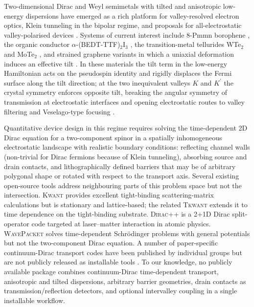 \documentclass[preprint, 11pt]{elsarticle}
\begin{document}
Two-dimensional Dirac and Weyl semimetals with tilted and anisotropic
low-energy dispersions have emerged as a rich platform for
valley-resolved electron optics, Klein tunneling in the bipolar
regime, and proposals for all-electrostatic valley-polarised devices
\cite{CastroNeto2009,Goerbig2008,Kong2021,Zhang2018,Nguyen2018}.
Systems of current interest include 8-Pmmn borophene
\cite{LopezBezanilla2016,Zabolotskiy2016}, the organic conductor
$\alpha$-(BEDT-TTF)$_2$I$_3$ \cite{Goerbig2008}, the transition-metal
tellurides WTe$_2$ and MoTe$_2$ \cite{Soluyanov2015,Wang2019}, and
strained graphene variants in which a uniaxial deformation induces an
effective tilt \cite{Pereira2009,Oliva2020}. In these materials the
tilt term in the low-energy Hamiltonian acts on the pseudospin
identity and rigidly displaces the Fermi surface along the tilt
direction; at the two inequivalent valleys $K$ and $K^\prime$ the
crystal symmetry enforces opposite tilt, breaking the angular
symmetry of transmission at electrostatic interfaces and opening
electrostatic routes to valley filtering and Veselago-type focusing
\cite{Nguyen2018,Cheianov2007}.

Quantitative device design in this regime requires solving the
time-dependent 2D Dirac equation for a two-component spinor in a
spatially inhomogeneous electrostatic landscape with realistic
boundary conditions: reflecting channel walls (non-trivial for Dirac
fermions because of Klein tunneling), absorbing source and drain
contacts, and lithographically defined barriers that may be of
arbitrary polygonal shape or rotated with respect to the transport
axis. Several existing open-source tools address neighbouring parts
of this problem space but not the intersection. \textsc{Kwant}
\cite{Groth2014} provides excellent tight-binding scattering-matrix
calculations but is stationary and lattice-based; the related
\textsc{Tkwant} \cite{Kloss2021} extends it to time dependence on the
tight-binding substrate. \textsc{Dirac++} \cite{Mocken2008} is a
2+1D Dirac split-operator code targeted at laser--matter interaction
in atomic physics. \textsc{WavePacket} \cite{Schmidt2019} solves
time-dependent Schr\"odinger problems with general potentials but
not the two-component Dirac equation. A number of paper-specific
continuum-Dirac transport codes have been published by individual
groups but are not publicly released as installable tools
\cite{Chaves2015}. To our knowledge, no publicly available package
combines continuum-Dirac time-dependent transport, anisotropic and
tilted dispersions, arbitrary barrier geometries, drain contacts as
transmission/reflection detectors, and optional intervalley coupling
in a single installable workflow.
\end{document}
